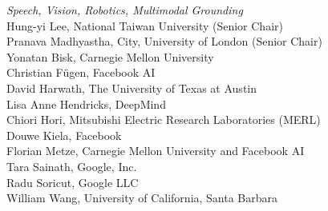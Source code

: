 \emph{Speech, Vision, Robotics, Multimodal Grounding} \\
\hspace*{0.2in} Hung-yi Lee, National Taiwan University (Senior Chair)\\
\hspace*{0.2in} Pranava Madhyastha, City, University of London (Senior Chair)\\
\hspace*{0.2in} Yonatan Bisk, Carnegie Mellon University\\
\hspace*{0.2in} Christian Fügen, Facebook AI\\
\hspace*{0.2in} David Harwath, The University of Texas at Austin\\
\hspace*{0.2in} Lisa Anne Hendricks, DeepMind\\
\hspace*{0.2in} Chiori Hori, Mitsubishi Electric Research Laboratories (MERL)\\
\hspace*{0.2in} Douwe Kiela, Facebook\\
\hspace*{0.2in} Florian Metze, Carnegie Mellon University and Facebook AI\\
\hspace*{0.2in} Tara Sainath, Google, Inc.\\
\hspace*{0.2in} Radu Soricut, Google LLC\\
\hspace*{0.2in} William Wang, University of California, Santa Barbara\\

